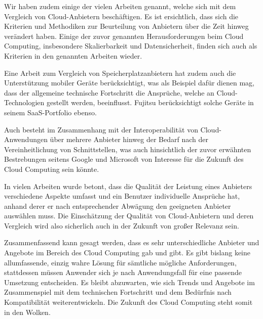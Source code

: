Wir haben zudem einige der vielen Arbeiten genannt, welche sich mit dem Vergleich von Cloud-Anbietern beschäftigen. 
Es ist ersichtlich, dass sich die Kriterien und Methodiken zur Beurteilung von Anbietern über die Zeit hinweg verändert haben. 
Einige der zuvor genannten Herausforderungen beim Cloud Computing, insbesondere Skalierbarkeit und Datensicherheit, finden sich auch als Kriterien in den genannten Arbeiten wieder. 

Eine Arbeit zum Vergleich von Speicherplatzanbietern hat zudem auch die Unterstützung mobiler Geräte berücksichtigt, was als Beispiel dafür dienen mag, dass der allgemeine technische Fortschritt die Ansprüche, welche an Cloud-Technologien gestellt werden, beeinflusst. 
Fujitsu berücksichtigt solche Geräte in seinem SaaS-Portfolio ebenso.

Auch besteht im Zusammenhang mit der Interoperabilität von Cloud-Anwendungen über mehrere Anbieter hinweg der Bedarf nach der Vereinheitlichung von Schnittstellen, was auch hinsichtlich der zuvor erwähnten Bestrebungen seitens Google und Microsoft von Interesse für die Zukunft des Cloud Computing sein könnte.

In vielen Arbeiten wurde betont, dass die Qualität der Leistung eines Anbieters verschiedene Aspekte umfasst und ein Benutzer individuelle Ansprüche hat, anhand derer er nach entsprechender Abwägung den geeigneten Anbieter auswählen muss. 
Die Einschätzung der Qualität von Cloud-Anbietern und deren Vergleich wird also  sicherlich auch in der Zukunft von großer Relevanz sein. 


Zusammenfassend kann gesagt werden, dass es sehr unterschiedliche Anbieter und Angebote im Bereich des Cloud Computing gab und gibt. 
Es gibt bislang keine allumfassende, einzig wahre Lösung für sämtliche mögliche Anforderungen, stattdessen müssen Anwender sich je nach Anwendungsfall für eine passende Umsetzung entscheiden. 
Es bleibt abzuwarten, wie sich Trends und Angebote im Zusammenspiel mit dem technischen Fortschritt und dem Bedürfnis nach Kompatibilität weiterentwickeln. 
Die Zukunft des Cloud Computing steht somit in den Wolken.
